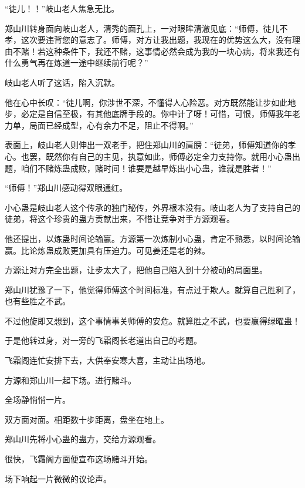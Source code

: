 
\begin{this_body}



“徒儿！！”岐山老人焦急无比。

郑山川转身面向岐山老人，清秀的面孔上，一对眼眸清澈见底：“师傅，徒儿不孝，这次要违背您的意志了。师傅，对方让我出题，我现在的优势这么大，没有理由不赌！若这种条件下，我还不赌，这事情必然会成为我的一块心病，将来我还有什么勇气再在炼道一途中继续前行呢？”

岐山老人听了这话，陷入沉默。

他在心中长叹：“徒儿啊，你涉世不深，不懂得人心险恶。对方既然能让步如此地步，必定是自信至极，有其他底牌手段的。你中计了呀！可惜，可恨，师傅我年老力单，局面已经成型，心有余力不足，阻止不得啊。”

表面上，岐山老人则伸出一双老手，把住郑山川的肩膀：“徒弟，师傅知道你的孝心。也罢，既然你有自己的主见，执意如此，师傅必定全力支持你。就用小心蛊出题，咱们不赌炼蛊成败，赌时间！谁要是越早炼出小心蛊，谁就是胜者！”

“师傅！”郑山川感动得双眼通红。

小心蛊是岐山老人这个传承的独门秘传，外界根本没有。岐山老人为了支持自己的徒弟，将这个珍贵的蛊方贡献出来，不惜让竞争对手方源观看。

他还提出，以炼蛊时间论输赢。方源第一次炼制小心蛊，肯定不熟悉，以时间论输赢。比论炼蛊成败更加具有压迫力。可见姜还是老的辣。

方源让对方完全出题，让步太大了，把他自己陷入到十分被动的局面里。

郑山川犹豫了一下，他觉得师傅这个时间标准，有点过于欺人。就算自己胜利了，也有些胜之不武。

不过他旋即又想到，这个事情事关师傅的安危。就算胜之不武，也要赢得绿曜蛊！

于是他转过身，对一旁的飞霜阁长老道出自己的考题。

飞霜阁连忙安排下去，大供奉安寒大喜，主动让出场地。

方源和郑山川一起下场。进行赌斗。

全场静悄悄一片。

双方面对面。相距数十步距离，盘坐在地上。

郑山川先将小心蛊的蛊方，交给方源观看。

很快，飞霜阁方面便宣布这场赌斗开始。

场下响起一片微微的议论声。


\end{this_body}
